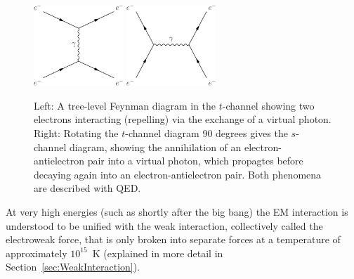 \begin{figure}[H]
    \centering
    \vspace{0.05\textwidth}
    \includegraphics[width=0.3\textwidth]{Images/QEDInteraction.pdf}\hspace{0.1\textwidth}
    \includegraphics[width=0.3\textwidth]{Images/QED_s_channel.pdf}\vspace{0.05\textwidth}
    \caption{Left: A tree-level Feynman diagram in the $t$-channel showing two electrons interacting (repelling) via the exchange of a virtual photon. Right: Rotating the $t$-channel diagram 90 degrees gives the $s$-channel diagram, showing the annihilation of an electron-antielectron pair into a virtual photon, which propagtes before decaying again into an electron-antielectron pair. Both phenomena are described with QED.}
    \label{fig:QEDFeynmanDiagram}
\end{figure}
At very high energies (such as shortly after the big bang) the EM interaction is understood to be unified with the weak interaction, collectively called the electroweak force, that is only broken into separate forces at a temperature of approximately $10^{15}$~K (explained in more detail in Section~\ref{sec:WeakInteraction}).